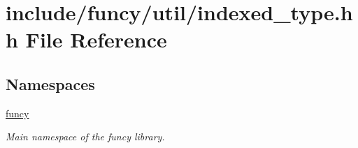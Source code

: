 \hypertarget{indexed__type_8hh}{\section{include/funcy/util/indexed\-\_\-type.hh File Reference}
\label{indexed__type_8hh}
}
\subsection*{Namespaces}
\begin{DoxyCompactItemize}
\item 
\hyperlink{namespacefuncy}{funcy}
\begin{DoxyCompactList}\small\item\em Main namespace of the funcy library. \end{DoxyCompactList}\end{DoxyCompactItemize}
